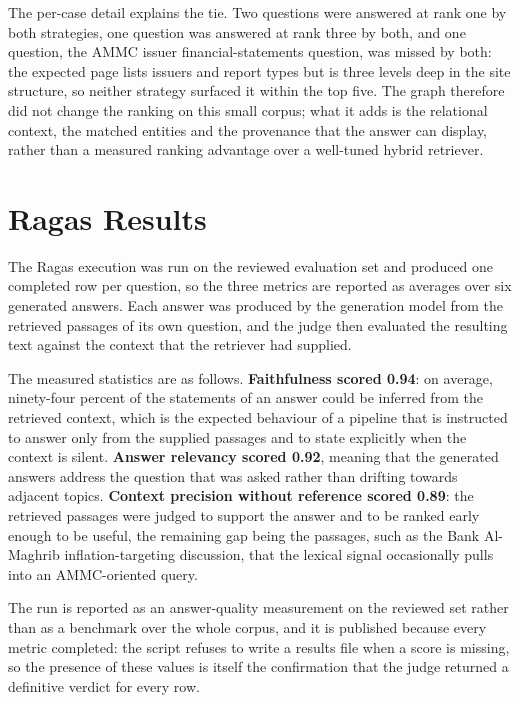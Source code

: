The per-case detail explains the tie. Two questions were answered at rank one by both strategies, one question was answered at rank three by both, and one question, the AMMC issuer financial-statements question, was missed by both: the expected page lists issuers and report types but is three levels deep in the site structure, so neither strategy surfaced it within the top five. The graph therefore did not change the ranking on this small corpus; what it adds is the relational context, the matched entities and the provenance that the answer can display, rather than a measured ranking advantage over a well-tuned hybrid retriever.

\section{Ragas Results}
\label{sec:ragas-results}
The Ragas execution was run on the reviewed evaluation set and produced one completed row per question, so the three metrics are reported as averages over six generated answers. Each answer was produced by the generation model from the retrieved passages of its own question, and the judge then evaluated the resulting text against the context that the retriever had supplied.

The measured statistics are as follows. \textbf{Faithfulness scored 0.94}: on average, ninety-four percent of the statements of an answer could be inferred from the retrieved context, which is the expected behaviour of a pipeline that is instructed to answer only from the supplied passages and to state explicitly when the context is silent. \textbf{Answer relevancy scored 0.92}, meaning that the generated answers address the question that was asked rather than drifting towards adjacent topics. \textbf{Context precision without reference scored 0.89}: the retrieved passages were judged to support the answer and to be ranked early enough to be useful, the remaining gap being the passages, such as the Bank Al-Maghrib inflation-targeting discussion, that the lexical signal occasionally pulls into an AMMC-oriented query.

The run is reported as an answer-quality measurement on the reviewed set rather than as a benchmark over the whole corpus, and it is published because every metric completed: the script refuses to write a results file when a score is missing, so the presence of these values is itself the confirmation that the judge returned a definitive verdict for every row.

